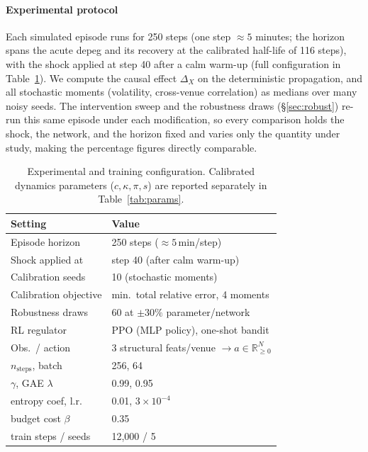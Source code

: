\documentclass[sigconf,anonymous]{acmart}
\begin{document}
\paragraph{Experimental protocol} Each simulated episode runs for 250 steps (one step
$\approx5$ minutes; the horizon spans the acute depeg and its recovery at the calibrated
half-life of 116 steps), with the shock applied at step
40 after a calm warm-up (full configuration in Table~\ref{tab:config}). We compute the causal effect $\Delta_X$ on the deterministic propagation, and
all stochastic moments (volatility, cross-venue correlation) as medians over many noisy seeds. The
intervention sweep and the robustness draws (\S\ref{sec:robust}) re-run this same episode under each
modification, so every comparison holds the shock, the network, and the horizon fixed and varies only
the quantity under study, making the percentage figures directly comparable.

\begin{table}[t]
\caption{Experimental and training configuration. Calibrated dynamics parameters
($c,\kappa,\pi,s$) are reported separately in Table~\ref{tab:params}.}
\label{tab:config}
\small
\setlength{\tabcolsep}{4.5pt}
\begin{tabular}{ll}
\toprule
Setting & Value \\
\midrule
Episode horizon & 250 steps ($\approx5$\,min/step) \\
Shock applied at & step 40 (after calm warm-up) \\
Calibration seeds & 10 (stochastic moments) \\
Calibration objective & min.\ total relative error, 4 moments \\
Robustness draws & 60 at $\pm30\%$ parameter/network \\
\midrule
RL regulator & PPO (MLP policy), one-shot bandit \\
Obs.\ / action & 3 structural feats/venue $\to a\in\mathbb{R}^N_{\ge0}$ \\
$n_{\text{steps}}$, batch & 256, 64 \\
$\gamma$, GAE $\lambda$ & 0.99, 0.95 \\
entropy coef, l.r.\ & 0.01, $3\times10^{-4}$ \\
budget cost $\beta$ & 0.35 \\
train steps / seeds & 12{,}000 / 5 \\
\bottomrule
\end{tabular}
\end{table}
\end{document}
